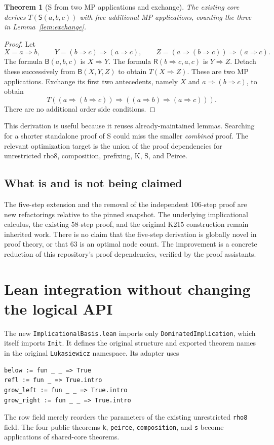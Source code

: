 \documentclass[11pt,letterpaper]{article}
\newtheorem{theorem}{Theorem}[section]
\newcommand{\Imp}{\mathbin{\Rightarrow}}
\newcommand{\Prv}[1]{T(#1)}
\newcommand{\core}{\texttt{DominatedImplication}}
\begin{document}
\begin{theorem}[S from two MP applications and exchange]\label{thm:s}
The existing core derives $\Prv{\mathsf S(a,b,c)}$ with five additional MP
applications, counting the three in Lemma~\ref{lem:exchange}.
\end{theorem}
\begin{proof}
Let
\[
 X=a\Imp b,\qquad Y=(b\Imp c)\Imp(a\Imp c),\qquad
 Z=(a\Imp(b\Imp c))\Imp(a\Imp c).
\]
The formula $\mathsf B(a,b,c)$ is $X\Imp Y$. The formula
$\mathsf R(b\Imp c,a,c)$ is $Y\Imp Z$. Detach these successively from
$\mathsf B(X,Y,Z)$ to obtain $\Prv{X\Imp Z}$. These are two MP
applications. Exchange its first two antecedents, namely $X$ and
$a\Imp(b\Imp c)$, to obtain
\[
 \Prv{(a\Imp(b\Imp c))\Imp((a\Imp b)\Imp(a\Imp c))}.
\]
There are no additional order side conditions.
\end{proof}

This derivation is useful because it reuses already-maintained lemmas. Searching
for a shorter standalone proof of S could miss the smaller \emph{combined}
proof. The relevant optimization target is the union of the proof dependencies
for unrestricted rho8, composition, prefixing, K, S, and Peirce.

\subsection{What is and is not being claimed}

The five-step extension and the removal of the independent 106-step proof are
new refactorings relative to the pinned snapshot. The underlying implicational
calculus, the existing 58-step proof, and the original K215 construction remain
inherited work. There is no claim that the five-step derivation is globally
novel in proof theory, or that 63 is an optimal node count. The improvement is a
concrete reduction of this repository's proof dependencies, verified by the
proof assistants.

\section{Lean integration without changing the logical API}

The new \texttt{ImplicationalBasis.lean} imports only \core{}, which itself
imports \texttt{Init}. It defines the original structure and exported theorem
names in the original \texttt{Lukasiewicz} namespace. Its adapter uses
\begin{lstlisting}
below := fun _ _ => True
refl := fun _ => True.intro
grow_left := fun _ _ => True.intro
grow_right := fun _ _ => True.intro
\end{lstlisting}
The row field merely reorders the parameters of the existing unrestricted
\texttt{rho8} field. The four public theorems \texttt{k}, \texttt{peirce},
\texttt{composition}, and \texttt{s} become applications of shared-core theorems.
\end{document}
